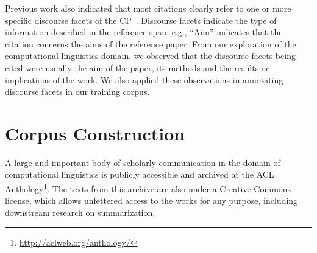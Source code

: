 \documentclass[11pt]{article}
\begin{document}
Previous work also indicated that most citations clearly refer to one
or more specific discourse facets of the CP~\cite{jaidka2013}.
Discourse facets indicate the type of information described in the
reference span: e.g., ``Aim'' indicates that the citation concerns the
aims of the reference paper. From our exploration of the computational
linguistics domain, we observed that the discourse facets being cited
were usually the aim of the paper, its methods and the results or
implications of the work. We also applied these observations in annotating
discourse facets in our training corpus.

\section{Corpus Construction}
\label{corpus}

A large and important body of scholarly communication in the domain of
computational linguistics is publicly accessible and archived at the
ACL Anthology\footnote{\url{http://aclweb.org/anthology/}}. The texts
from this archive are also under a Creative Commons license, which
allows unfettered access to the works for any purpose, including
downstream research on summarization.
\end{document}

